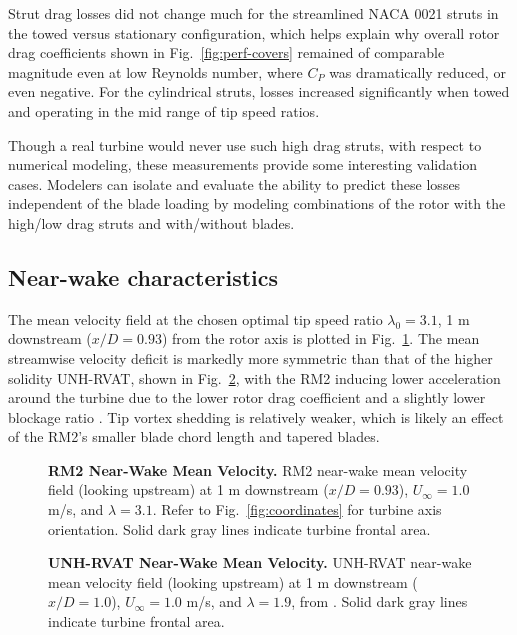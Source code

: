 \documentclass[10pt,letterpaper]{article}
\begin{document}
Strut drag losses did not change much for the streamlined NACA 0021 struts in
the towed versus stationary configuration, which helps explain why overall rotor
drag coefficients shown in Fig.~\ref{fig:perf-covers} remained of comparable
magnitude even at low Reynolds number, where $C_P$ was dramatically reduced, or
even negative. For the cylindrical struts, losses increased significantly when
towed and operating in the mid range of tip speed ratios.

Though a real turbine would never use such high drag struts, with respect to
numerical modeling, these measurements provide some interesting validation
cases. Modelers can isolate and evaluate the ability to predict these losses
independent of the blade loading by modeling combinations of the rotor with the
high/low drag struts and with/without blades.


\subsection*{Near-wake characteristics}

The mean velocity field at the chosen optimal tip speed ratio $\lambda_0=3.1$, 1
m downstream ($x/D=0.93$) from the rotor axis is plotted in
Fig.~\ref{fig:meancontquiv}. The mean streamwise velocity deficit is markedly
more symmetric than that of the higher solidity UNH-RVAT, shown in
Fig.~\ref{fig:rvat-meancontquiv}, with the RM2 inducing lower acceleration
around the turbine due to the lower rotor drag coefficient and a slightly lower
blockage ratio \cite{Bachant2015-JoT}. Tip vortex shedding is relatively weaker,
which is likely an effect of the RM2's smaller blade chord length and tapered
blades.

\begin{figure}

    \caption{{\bf RM2 Near-Wake Mean Velocity.} RM2 near-wake mean velocity
        field (looking upstream) at 1 m downstream ($x/D=0.93$), $U_\infty=1.0$ m/s,
        and $\lambda=3.1$. Refer to Fig.~\ref{fig:coordinates} for turbine axis
        orientation. Solid dark gray lines indicate turbine frontal area.}

    \label{fig:meancontquiv}
\end{figure}

\begin{figure}

    \caption{{\bf UNH-RVAT Near-Wake Mean Velocity.} UNH-RVAT near-wake mean
        velocity field (looking upstream) at 1 m downstream ($x/D=1.0$),
        $U_\infty=1.0$ m/s, and $\lambda=1.9$, from \cite{Bachant2016-Energies}.
        Solid dark gray lines indicate turbine frontal area.}

    \label{fig:rvat-meancontquiv}
\end{figure}
\end{document}
